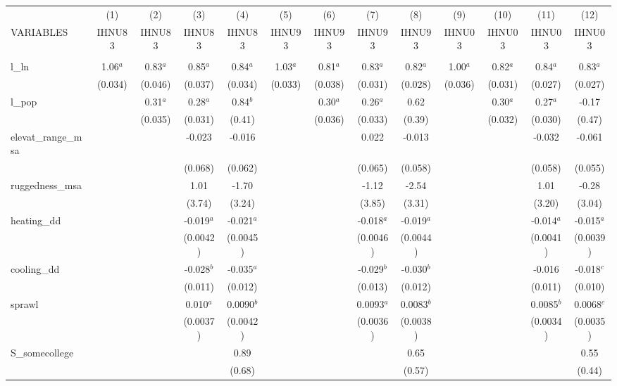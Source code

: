\documentclass[]{article}
\begin{document}
\begin{tabular}{lcccccccccccc} \hline
 & (1) & (2) & (3) & (4) & (5) & (6) & (7) & (8) & (9) & (10) & (11) & (12) \\
VARIABLES & IHNU83 & IHNU83 & IHNU83 & IHNU83 & IHNU93 & IHNU93 & IHNU93 & IHNU93 & IHNU03 & IHNU03 & IHNU03 & IHNU03 \\ \hline
 &  &  &  &  &  &  &  &  &  &  &  &  \\
l\_ln & 1.06$^a$ & 0.83$^a$ & 0.85$^a$ & 0.84$^a$ & 1.03$^a$ & 0.81$^a$ & 0.83$^a$ & 0.82$^a$ & 1.00$^a$ & 0.82$^a$ & 0.84$^a$ & 0.83$^a$ \\
 & (0.034) & (0.046) & (0.037) & (0.034) & (0.033) & (0.038) & (0.031) & (0.028) & (0.036) & (0.031) & (0.027) & (0.027) \\
l\_pop &  & 0.31$^a$ & 0.28$^a$ & 0.84$^b$ &  & 0.30$^a$ & 0.26$^a$ & 0.62 &  & 0.30$^a$ & 0.27$^a$ & -0.17 \\
 &  & (0.035) & (0.031) & (0.41) &  & (0.036) & (0.033) & (0.39) &  & (0.032) & (0.030) & (0.47) \\
elevat\_range\_msa &  &  & -0.023 & -0.016 &  &  & 0.022 & -0.013 &  &  & -0.032 & -0.061 \\
 &  &  & (0.068) & (0.062) &  &  & (0.065) & (0.058) &  &  & (0.058) & (0.055) \\
ruggedness\_msa &  &  & 1.01 & -1.70 &  &  & -1.12 & -2.54 &  &  & 1.01 & -0.28 \\
 &  &  & (3.74) & (3.24) &  &  & (3.85) & (3.31) &  &  & (3.20) & (3.04) \\
heating\_dd &  &  & -0.019$^a$ & -0.021$^a$ &  &  & -0.018$^a$ & -0.019$^a$ &  &  & -0.014$^a$ & -0.015$^a$ \\
 &  &  & (0.0042) & (0.0045) &  &  & (0.0046) & (0.0044) &  &  & (0.0041) & (0.0039) \\
cooling\_dd &  &  & -0.028$^b$ & -0.035$^a$ &  &  & -0.029$^b$ & -0.030$^b$ &  &  & -0.016 & -0.018$^c$ \\
 &  &  & (0.011) & (0.012) &  &  & (0.013) & (0.012) &  &  & (0.011) & (0.010) \\
sprawl &  &  & 0.010$^a$ & 0.0090$^b$ &  &  & 0.0093$^a$ & 0.0083$^b$ &  &  & 0.0085$^b$ & 0.0068$^c$ \\
 &  &  & (0.0037) & (0.0042) &  &  & (0.0036) & (0.0038) &  &  & (0.0034) & (0.0035) \\
S\_somecollege &  &  &  & 0.89 &  &  &  & 0.65 &  &  &  & 0.55 \\
 &  &  &  & (0.68) &  &  &  & (0.57) &  &  &  & (0.44) \\

\end{tabular}
\end{document}

